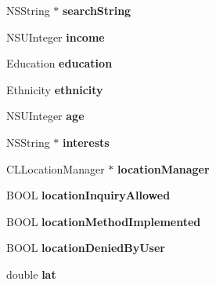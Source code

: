 \begin{DoxyCompactItemize}
\item 
\hypertarget{interface_user_info_a69e7c36b232a3d4a1c2701d94a92dbc3}{
NSString $\ast$ {\bfseries searchString}}
\label{interface_user_info_a69e7c36b232a3d4a1c2701d94a92dbc3}

\item 
\hypertarget{interface_user_info_ace906605787cddc968ce4f9c514b7eb5}{
NSUInteger {\bfseries income}}
\label{interface_user_info_ace906605787cddc968ce4f9c514b7eb5}

\item 
\hypertarget{interface_user_info_a90deec55047679b044309e8c17731a68}{
Education {\bfseries education}}
\label{interface_user_info_a90deec55047679b044309e8c17731a68}

\item 
\hypertarget{interface_user_info_af1f49b4e6fe086e19190520093009951}{
Ethnicity {\bfseries ethnicity}}
\label{interface_user_info_af1f49b4e6fe086e19190520093009951}

\item 
\hypertarget{interface_user_info_a6ecad16706c639e40c88d04cfc75f907}{
NSUInteger {\bfseries age}}
\label{interface_user_info_a6ecad16706c639e40c88d04cfc75f907}

\item 
\hypertarget{interface_user_info_a2458745491e8480cf585d1790df09177}{
NSString $\ast$ {\bfseries interests}}
\label{interface_user_info_a2458745491e8480cf585d1790df09177}

\item 
\hypertarget{interface_user_info_a4e0531a2fd47aa3288250d65b0cad31c}{
CLLocationManager $\ast$ {\bfseries locationManager}}
\label{interface_user_info_a4e0531a2fd47aa3288250d65b0cad31c}

\item 
\hypertarget{interface_user_info_a255595448122f8527b5d79310c727891}{
BOOL {\bfseries locationInquiryAllowed}}
\label{interface_user_info_a255595448122f8527b5d79310c727891}

\item 
\hypertarget{interface_user_info_a3e1afa1e46c4df667e37a0f6ee033fd3}{
BOOL {\bfseries locationMethodImplemented}}
\label{interface_user_info_a3e1afa1e46c4df667e37a0f6ee033fd3}

\item 
\hypertarget{interface_user_info_a133e21b8e5db12fab10771c073adfc12}{
BOOL {\bfseries locationDeniedByUser}}
\label{interface_user_info_a133e21b8e5db12fab10771c073adfc12}

\item 
\hypertarget{interface_user_info_a5311238dfbf0f4b22f1eda80af38b013}{
double {\bfseries lat}}
\label{interface_user_info_a5311238dfbf0f4b22f1eda80af38b013}


\end{DoxyCompactItemize}
